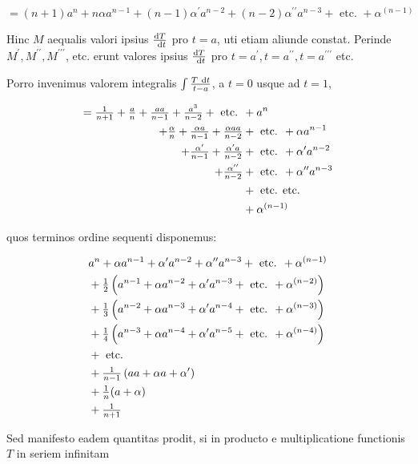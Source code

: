\documentclass[twoside,12pt, showframe]{memoir}
\let\oldfrac\frac
\def\frac#1#2{\mathchoice{\tfrac{#1}{#2}}{\oldfrac{#1}{#2}}{\genfrac{}{}{}{2}{#1}{#2\mathstrut}}{\genfrac{}{}{}{3}{#1}{#2\mathstrut}}}
\begin{document}
\[
=(n+1) a^{n}+n \alpha a^{n-1}+(n-1) \alpha^{\prime} a^{n-2}+(n-2) \alpha^{\prime \prime} a^{n-3}+\text { etc. }+\alpha^{(n-1)}
\]

Hinc \(M\) aequalis valori ipsius \(\frac{\mathrm{d} T}{\mathrm{~d} t}\) pro \(t=a\), uti etiam aliunde constat. Perinde \(M^{\prime}, M^{\prime \prime}, M^{\prime \prime \prime}\), etc. erunt valores ipsius \(\frac{\mathrm{d} T}{\mathrm{~d} t}\) pro \(t=a^{\prime}, t=a^{\prime \prime}, t=a^{\prime \prime \prime}\) etc.

Porro invenimus valorem integralis \(\int \frac{T \mathrm{~d} t}{t-a}\), a \(t=0\) usque ad \(t=1\),

\[
\begin{aligned}
=\frac{1}{n+1}+\frac{a}{n}+\frac{a a}{n-1}+\frac{a^{3}}{n-2}+\text { etc. } & +a^{n} \\
+\frac{\alpha}{n}+\frac{\alpha a}{n-1}+\frac{\alpha a a}{n-2} & + \text { etc. }+\alpha a^{n-1} \\
+\frac{\alpha^{\prime}}{n-1}+\frac{\alpha^{\prime} a}{n-2} & + \text { etc. }+\alpha^{\prime} a^{n-2} \\
+\frac{\alpha^{\prime \prime}}{n-2} & + \text { etc. }+\alpha^{\prime \prime} a^{n-3} \\
& + \text { etc. etc. } \\
& +\alpha^{(n-1)}
\end{aligned}
\]

quos terminos ordine sequenti disponemus:

\[
\begin{aligned}
& a^{n}+\alpha a^{n-1}+\alpha^{\prime} a^{n-2}+\alpha^{\prime \prime} a^{n-3}+\text { etc. }+\alpha^{(n-1)} \\
& +\frac{1}{2}\left(a^{n-1}+\alpha a^{n-2}+\alpha^{\prime} a^{n-3}+\text { etc. }+\alpha^{(n-2)}\right) \\
& +\frac{1}{3}\left(a^{n-2}+\alpha a^{n-3}+\alpha^{\prime} a^{n-4}+\text { etc. }+\alpha^{(n-3)}\right) \\
& +\frac{1}{4}\left(a^{n-3}+\alpha a^{n-4}+\alpha^{\prime} a^{n-5}+\text { etc. }+\alpha^{(n-4)}\right) \\
& + \text { etc. } \\
& +\frac{1}{n-1}\left(a a+\alpha a+\alpha^{\prime}\right) \\
& +\frac{1}{n}(a+\alpha) \\
& +\frac{1}{n+1}
\end{aligned}
\]

Sed manifesto eadem quantitas prodit, si in producto e multiplicatione functionis \(T\) in seriem infinitam
\end{document}
